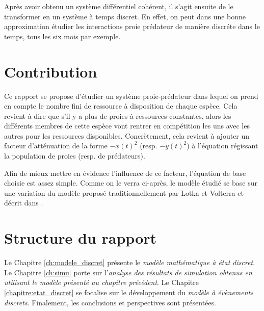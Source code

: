 Après avoir obtenu un système différentiel cohérent, il s'agit ensuite de le transformer en un système à temps discret. En effet, on peut dans une bonne approximation étudier les interactions proie prédateur de manière discréte dans le temps, tous les six mois par exemple.

\section{Contribution}
\label{sec:Contribution}

Ce rapport se propose d'étudier un système proie-prédateur dans lequel on prend en compte le nombre fini de ressource à disposition de chaque espèce. Cela revient à dire que s'il y a plus de proies à ressources constantes, alors les différents membres de cette espèce vont rentrer en compétition les uns avec les autres pour les ressources disponibles.
Concrètement, cela revient à ajouter un facteur d'atténuation de la forme $- x(t)^2$ (resp. $- y(t)^2$) à l'équation régissant la population de proies (resp. de prédateurs).

Afin de mieux mettre en évidence l'influence de ce facteur, l'équation de base choisie est assez simple. Comme on le verra ci-après, le modèle étudié se base sur une variation du modèle proposé traditionnellement par Lotka et Volterra et décrit dans \cite{}. 

\section{Structure du rapport}
\label{sec:Structure}

Le Chapitre \ref{ch:modele_discret} présente le \textit{modèle mathématique à état discret}. Le Chapitre \ref{ch:simu} porte sur l’\textit{analyse des résultats de simulation obtenus en utilisant le modèle présenté au chapitre précédent}. Le Chapitre \ref{chapitre:etat_discret} se focalise sur le développement du \textit{modèle à évènements discrets}. Finalement, les conclusions et perspectives sont présentées.
